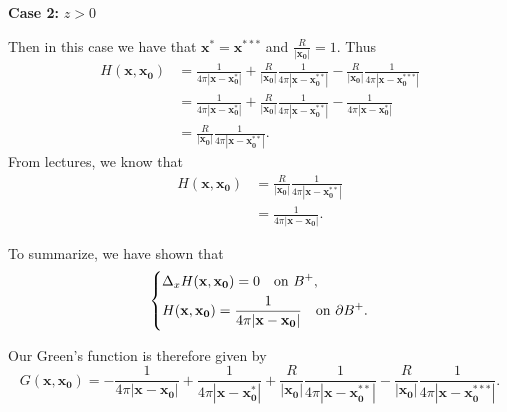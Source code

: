 \documentclass{article}
\def\*#1{\mathbf{#1}}
\begin{document}
\textbf{Case 2:} $z > 0$

Then in this case we have that $\*{x^{*}} = \*{x^{***}}$ and
$\frac{R}{|\*{x_0}|} = 1$. Thus
%
\begin{align*}
    H(\*{x}, \*{x_0}) &=
        \frac{1}{4 \pi |\*x - \*{x_0^*}|}
        + \frac{R}{|\*{x_0}|} \frac{1}{4 \pi |\*x - \*{x_0^{**}}|}
        - \frac{R}{|\*{x_0}|} \frac{1}{4 \pi |\*x - \*{x_0^{***}}|} \\
    &=
        \frac{1}{4 \pi |\*x - \*{x_0^*}|}
        + \frac{R}{|\*{x_0}|} \frac{1}{4 \pi |\*x - \*{x_0^{**}}|}
        - \frac{1}{4 \pi |\*x - \*{x_0^{*}}|} \\
    &=
        \frac{R}{|\*{x_0}|} \frac{1}{4 \pi |\*x - \*{x_0^{**}}|}
    .
\end{align*}
%
From lectures, we know that
%
\begin{align*}
    H(\*{x}, \*{x_0})
        &= \frac{R}{|\*{x_0}|} \frac{1}{4 \pi |\*x - \*{x_0^{**}}|} \\
        &= \frac{1}{4 \pi |\*x - \*{x_0}|}
    .
\end{align*}

To summarize, we have shown that
%
\begin{equation*}
    \begin{dcases}
        \Delta_x H(\*x, \*{x_0}) = 0 \quad \text{on } B^+, \\
        H(\*x, \*{x_0}) = \frac{1}{4 \pi |\*x - \*{x_0}|} \quad \text{on } \partial B^+.
    \end{dcases}
\end{equation*}

Our Green's function is therefore given by
%
\begin{equation*}
    G(\*x, \*{x_0}) =
        - \frac{1}{4 \pi |\*x - \*{x_0}|}
        + \frac{1}{4 \pi |\*x - \*{x_0^*}|}
        + \frac{R}{|\*{x_0}|} \frac{1}{4 \pi |\*x - \*{x_0^{**}}|}
        - \frac{R}{|\*{x_0}|} \frac{1}{4 \pi |\*x - \*{x_0^{***}}|}
    .
\end{equation*}
\end{document}
